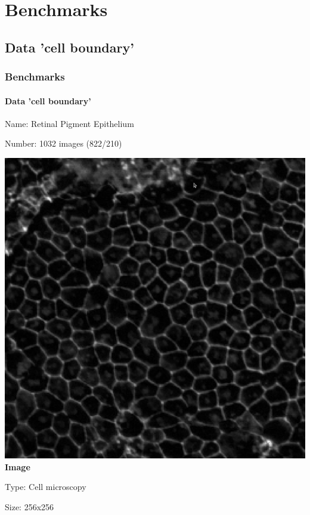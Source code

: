 \def\sectiontitle{Benchmarks}

\section{\sectiontitle}

\def\slidetitle{Data 'cell boundary'}

\subsection{\slidetitle}
\begin{frame}
  \frametitle{\sectiontitle}
  \framesubtitle{\slidetitle}

  \begin{minipage}[h!]{0.40\textwidth}
    Name: Retinal Pigment Epithelium

    Number: 1032 images (822/210)

    \centering
    \includegraphics[scale=0.12]{./img/3_benchmark/image.png}
    \textbf{Image}
  \end{minipage}\hfill
  \begin{minipage}[h!]{0.40\textwidth}
    Type: Cell microscopy

    Size: 256x256


\end{minipage}
\end{frame}
